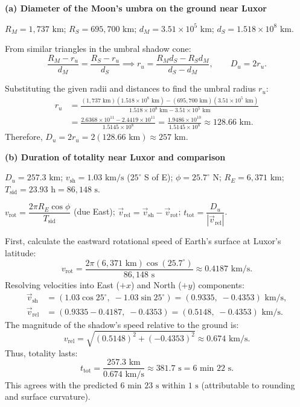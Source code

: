 \documentclass[11pt, a4paper]{article}
\newcommand{\subquestion}[1]{%
    \vspace{14pt}
    \noindent\textbf{\large\color{navyaccent}#1}
    \vspace{4pt}
}
\newcommand{\gfsblock}[3]{%
    \begin{description}[leftmargin=2.1cm, labelwidth=1.9cm, labelsep=0.2cm, itemsep=5pt, topsep=3pt, parsep=3pt, align=left]
        \item[\textbf{\color{navyaccent}Given:}] #1
        \item[\textbf{\color{navyaccent}Formula:}] #2
        \item[\textbf{\color{navyaccent}Solution:}] #3
    \end{description}
    \vspace{8pt}
}
\begin{document}
\subquestion{(a) Diameter of the Moon's umbra on the ground near Luxor}
\gfsblock
{$R_M = 1{,}737\text{ km}$; \quad $R_S = 695{,}700\text{ km}$; \quad $d_M = 3.51 \times 10^{5}\text{ km}$; \quad $d_S = 1.518 \times 10^{8}\text{ km}$.}
{From similar triangles in the umbral shadow cone:
\[
\frac{R_M - r_u}{d_M} = \frac{R_S - r_u}{d_S} \implies r_u = \frac{R_M d_S - R_S d_M}{d_S - d_M}, \qquad D_u = 2 r_u.
\]}
{Substituting the given radii and distances to find the umbral radius $r_u$:
\begin{align*}
r_u &= \frac{(1{,}737\text{ km})(1.518 \times 10^{8}\text{ km}) - (695{,}700\text{ km})(3.51 \times 10^{5}\text{ km})}{1.518 \times 10^{8}\text{ km} - 3.51 \times 10^{5}\text{ km}} \\
    &= \frac{2.6368 \times 10^{11} - 2.4419 \times 10^{11}}{1.5145 \times 10^{8}} = \frac{1.9486 \times 10^{10}}{1.5145 \times 10^{8}} \approx 128.66\text{ km}.
\end{align*}
Therefore, $D_u = 2 r_u = 2(128.66\text{ km}) \approx 257\text{ km}$.}

\subquestion{(b) Duration of totality near Luxor and comparison}
\gfsblock
{$D_u = 257.3\text{ km}$; \quad $v_{\text{sh}} = 1.03\text{ km/s}$ ($25^{\circ}$ S of E); \quad $\phi = 25.7^{\circ}\text{ N}$; \quad $R_E = 6{,}371\text{ km}$; \quad $T_{\text{sid}} = 23.93\text{ h} = 86{,}148\text{ s}$.}
{$v_{\text{rot}} = \dfrac{2\pi R_E \cos\phi}{T_{\text{sid}}}$ (due East); \quad $\vec{v}_{\text{rel}} = \vec{v}_{\text{sh}} - \vec{v}_{\text{rot}}$; \quad $t_{\text{tot}} = \dfrac{D_u}{|\vec{v}_{\text{rel}}|}$.}
{First, calculate the eastward rotational speed of Earth's surface at Luxor's latitude:
\[
v_{\text{rot}} = \frac{2\pi (6{,}371\text{ km}) \cos(25.7^{\circ})}{86{,}148\text{ s}} \approx 0.4187\text{ km/s}.
\]
Resolving velocities into East ($+x$) and North ($+y$) components:
\begin{align*}
\vec{v}_{\text{sh}} &= (1.03\cos 25^{\circ},\; -1.03\sin 25^{\circ}) = (0.9335,\; -0.4353)\text{ km/s}, \\
\vec{v}_{\text{rel}} &= (0.9335 - 0.4187,\; -0.4353) = (0.5148,\; -0.4353)\text{ km/s}.
\end{align*}
The magnitude of the shadow's speed relative to the ground is:
\[
v_{\text{rel}} = \sqrt{(0.5148)^2 + (-0.4353)^2} \approx 0.674\text{ km/s}.
\]
Thus, totality lasts:
\[
t_{\text{tot}} = \frac{257.3\text{ km}}{0.674\text{ km/s}} \approx 381.7\text{ s} = 6\text{ min } 22\text{ s}.
\]
This agrees with the predicted $6\text{ min } 23\text{ s}$ within $1\text{ s}$ (attributable to rounding and surface curvature).}
\end{document}
